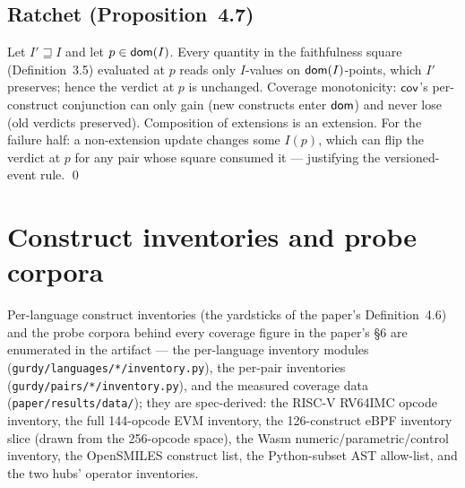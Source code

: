 \subsection{Ratchet (Proposition~4.7)}

Let $I' \sqsupseteq I$ and let $p \in \mathsf{dom}(I)$. Every quantity in
the faithfulness square (Definition~3.5) evaluated at $p$ reads only
$I$-values on
$\mathsf{dom}(I)$-points, which $I'$ preserves; hence the verdict at $p$ is
unchanged. Coverage monotonicity: $\mathsf{cov}$'s per-construct conjunction can
only gain (new constructs enter $\mathsf{dom}$) and never lose (old verdicts
preserved). Composition of extensions is an extension. For the failure
half: a non-extension update changes some $I(p)$, which can flip the
verdict at $p$ for any pair whose square consumed it --- justifying
the versioned-event rule. \qed

\section{Construct inventories and probe corpora}
\label{app:inventories}

Per-language construct inventories (the yardsticks of the paper's
Definition~4.6) and the probe corpora behind every coverage figure
in the paper's \S6 are enumerated in the artifact --- the per-language
inventory modules (\texttt{gurdy/languages/*/inventory.py}), the
per-pair inventories (\texttt{gurdy/pairs/*/inventory.py}), and the
measured coverage data (\texttt{paper/results/data/}); they are
spec-derived: the RISC-V RV64IMC opcode
inventory, the full 144-opcode EVM inventory, the 126-construct eBPF
inventory slice (drawn from the 256-opcode space), the Wasm
numeric/parametric/control inventory, the
OpenSMILES construct list, the Python-subset AST allow-list, and the
two hubs' operator inventories.
